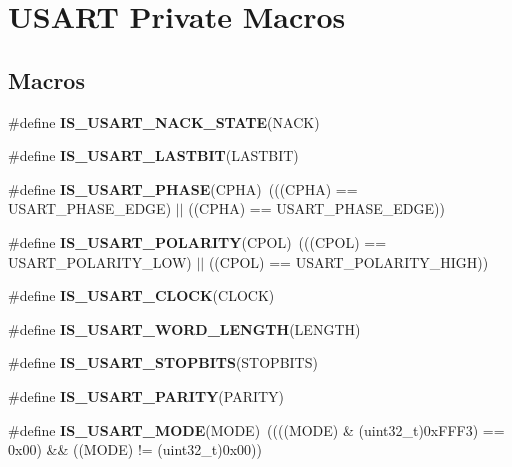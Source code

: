 \hypertarget{group___u_s_a_r_t___private___macros}{}\section{U\+S\+A\+RT Private Macros}
\label{group___u_s_a_r_t___private___macros}
\subsection*{Macros}
\begin{DoxyCompactItemize}
\item 
\#define {\bfseries I\+S\+\_\+\+U\+S\+A\+R\+T\+\_\+\+N\+A\+C\+K\+\_\+\+S\+T\+A\+TE}(N\+A\+CK)
\item 
\#define {\bfseries I\+S\+\_\+\+U\+S\+A\+R\+T\+\_\+\+L\+A\+S\+T\+B\+IT}(L\+A\+S\+T\+B\+IT)
\item 
\#define {\bfseries I\+S\+\_\+\+U\+S\+A\+R\+T\+\_\+\+P\+H\+A\+SE}(C\+P\+HA)~(((C\+P\+HA) == U\+S\+A\+R\+T\+\_\+\+P\+H\+A\+S\+E\+\_\+E\+D\+GE) $\vert$$\vert$ ((C\+P\+HA) == U\+S\+A\+R\+T\+\_\+\+P\+H\+A\+S\+E\+\_\+E\+D\+GE))\hypertarget{group___u_s_a_r_t___private___macros_ga6ea3d074e9204eb593472e03452e537b}{}\label{group___u_s_a_r_t___private___macros_ga6ea3d074e9204eb593472e03452e537b}

\item 
\#define {\bfseries I\+S\+\_\+\+U\+S\+A\+R\+T\+\_\+\+P\+O\+L\+A\+R\+I\+TY}(C\+P\+OL)~(((C\+P\+OL) == U\+S\+A\+R\+T\+\_\+\+P\+O\+L\+A\+R\+I\+T\+Y\+\_\+\+L\+OW) $\vert$$\vert$ ((C\+P\+OL) == U\+S\+A\+R\+T\+\_\+\+P\+O\+L\+A\+R\+I\+T\+Y\+\_\+\+H\+I\+GH))\hypertarget{group___u_s_a_r_t___private___macros_ga365cbaaf0cc68a8c689b4ee418cd287d}{}\label{group___u_s_a_r_t___private___macros_ga365cbaaf0cc68a8c689b4ee418cd287d}

\item 
\#define {\bfseries I\+S\+\_\+\+U\+S\+A\+R\+T\+\_\+\+C\+L\+O\+CK}(C\+L\+O\+CK)
\item 
\#define {\bfseries I\+S\+\_\+\+U\+S\+A\+R\+T\+\_\+\+W\+O\+R\+D\+\_\+\+L\+E\+N\+G\+TH}(L\+E\+N\+G\+TH)
\item 
\#define {\bfseries I\+S\+\_\+\+U\+S\+A\+R\+T\+\_\+\+S\+T\+O\+P\+B\+I\+TS}(S\+T\+O\+P\+B\+I\+TS)
\item 
\#define {\bfseries I\+S\+\_\+\+U\+S\+A\+R\+T\+\_\+\+P\+A\+R\+I\+TY}(P\+A\+R\+I\+TY)
\item 
\#define {\bfseries I\+S\+\_\+\+U\+S\+A\+R\+T\+\_\+\+M\+O\+DE}(M\+O\+DE)~((((M\+O\+DE) \& (uint32\+\_\+t)0x\+F\+F\+F3) == 0x00) \&\& ((\+M\+O\+D\+E) != (uint32\+\_\+t)0x00))\hypertarget{group___u_s_a_r_t___private___macros_gae9140e5ca405d2377fe0e82c79e136a2}{}\label{group___u_s_a_r_t___private___macros_gae9140e5ca405d2377fe0e82c79e136a2}


\end{DoxyCompactItemize}
